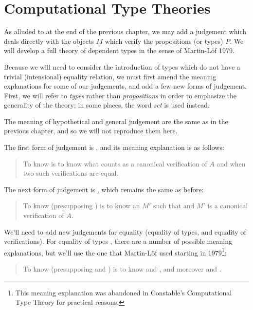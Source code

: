 \documentclass[main.tex]{subfiles}
\begin{document}
\onehalfspacing

\chapter{Computational Type Theories}

As alluded to at the end of the previous chapter, we may add a judgement
 which deals directly with the objects $M$ which verify the
propositions (or types) $P$. We will develop a full theory of dependent types in
the sense of Martin-L\"of 1979.

Because we will need to consider the introduction of types which do not have a
trivial (intensional) equality relation, we must first amend the meaning
explanations for some of our judgements, and add a few new forms of judgement.
First, we will refer to \emph{types} rather than \emph{propositions} in order
to emphasize the generality of the theory; in some places, the word \emph{set}
is used instead.

The meaning of hypothetical and general judgement are the same as in the
previous chapter, and so we will not reproduce them here.

The first form of judgement is , and its meaning explanation
is as follows:

\begin{quote}
  To know  is to know what counts as a canonical verification of $A$
  and when two such verifications are equal.
\end{quote}

The next form of judgement is , which remains the same as before:

\begin{quote}
  To know  (presupposing ) is to know an $M'$ such that
   and $M'$ is a canonical verification of $A$.
\end{quote}

We'll need to add new judgements for equality (equality of types, and equality
of verifications). For equality of types , there are a
number of possible meaning explanations, but we'll use the one that
Martin-L\"of used starting in 1979\footnote{This meaning explanation was
abandoned in Constable's Computational Type Theory for practical reasons.}:

\begin{quote}
  To know  (presupposing  and ) is to know
 and
, and moreover
 and
.
\end{quote}
\end{document}
